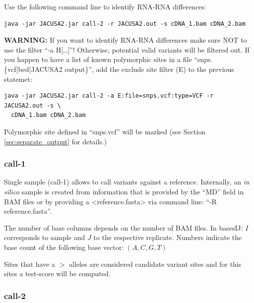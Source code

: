 \documentclass[10pt,a4paper,final]{article}
\begin{document}
Use the following command line to identify RNA-RNA differences:
\begin{verbatim}
java -jar JACUSA2.jar call-2 -r JACUSA2.out -s cDNA_1.bam cDNA_2.bam
\end{verbatim}
\textbf{WARNING:} If you want to identify RNA-RNA differences make sure NOT to use the filter ``-a
H[\ldots]''! Otherwise, potential valid variants will be filtered out. If you happen to have a list
of known polymorphic sites in a file ``snps.\{vcf|bed|JACUSA2 output\}'', add the exclude site filter (E)
to the previous statemet:
\begin{verbatim}
java -jar JACUSA2.jar call-2 -a E:file=snps.vcf:type=VCF -r JACUSA2.out -s \
  cDNA_1.bam cDNA_2.bam
\end{verbatim}
Polymorphic site defined in ``snps.vcf'' will be marked (see Section \ref{sec:separate_output} for details.)
\subsubsection{call-1}\label{sec:call_1}
Single sample (call-1) allows to call variants against a reference. 
Internally, an \textit{in silico} sample is created from information that is provided by the ``MD'' field 
in BAM files or by providing a <reference.fasta> via command line: ``-R reference.fasta''.

The number of base columns depends on the number of BAM files. In basesIJ: $I$
corresponds to sample and $J$ to the respective replicate. Numbers indicate the base count of the
following base vector: $(A, C, G, T)$

Sites that have a $>$ alleles are considered candidate variant sites and for this sites a test-score will be computed.
\subsubsection{call-2}\label{sec:call_2}
\end{document}
